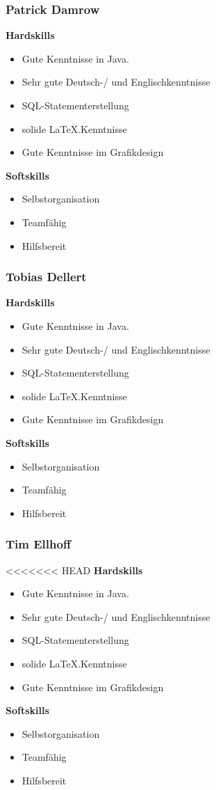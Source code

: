 \documentclass[fontsize=12pt,paper=a4,twoside]{scrartcl}
\begin{document}
\subsubsection{Patrick Damrow}

\textbf{Hardskills}
\begin{itemize}
\item{Gute Kenntnisse in Java.}
\item{Sehr gute Deutsch-/ und Englischkenntnisse}
\item{SQL-Statementerstellung}
\item{solide \LaTeX.Kenntnisse}
\item{Gute Kenntnisse im Grafikdesign}
\end{itemize}
\textbf{Softskills}
\begin{itemize}
\item{Selbstorganisation}
\item{Teamfähig}
\item{Hilfsbereit}
\end{itemize}

\subsubsection{Tobias Dellert}

\textbf{Hardskills}
\begin{itemize}
\item{Gute Kenntnisse in Java.}
\item{Sehr gute Deutsch-/ und Englischkenntnisse}
\item{SQL-Statementerstellung}
\item{solide \LaTeX.Kenntnisse}
\item{Gute Kenntnisse im Grafikdesign}
\end{itemize}
\textbf{Softskills}
\begin{itemize}
\item{Selbstorganisation}
\item{Teamfähig}
\item{Hilfsbereit}
\end{itemize}

\subsubsection{Tim Ellhoff}

<<<<<<< HEAD
\textbf{Hardskills}
\begin{itemize}
\item{Gute Kenntnisse in Java.}
\item{Sehr gute Deutsch-/ und Englischkenntnisse}
\item{SQL-Statementerstellung}
\item{solide \LaTeX.Kenntnisse}
\item{Gute Kenntnisse im Grafikdesign}
\end{itemize}
\textbf{Softskills}
\begin{itemize}
\item{Selbstorganisation}
\item{Teamfähig}
\item{Hilfsbereit}
\end{itemize}
\end{document}
